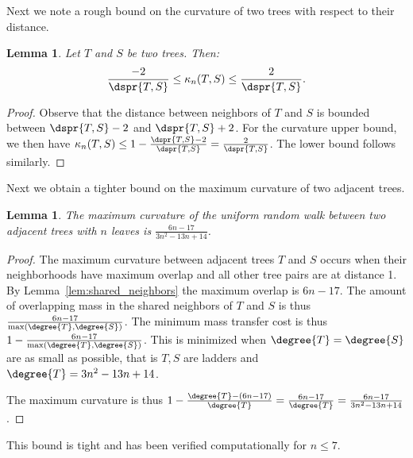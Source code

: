\documentclass[11pt,onecolumn,conference]{IEEEtran}
\newtheorem{lemma}[theorem]{Lemma}
\newcommand{\curvature}[2][]{%
    \ifthenelse{\equal{#1}{}}%
		{\kappa_n(#2)}%
		{\kappa_n(#1;#2)}%
}
\begin{document}
Next we note a rough bound on the curvature of two trees with respect to their distance.

\begin{lemma}
	\label{lem:curvature_distance_bound}
	Let $T$ and $S$ be two trees. Then:
	$$ \frac{-2}{\dspr{T,S}} \le \curvature{T,S} \le \frac{2}{\dspr{T,S}} .$$
\end{lemma}
\begin{proof}
	Observe that the distance between neighbors of $T$ and $S$ is bounded between $\dspr{T,S} - 2$ and $\dspr{T,S} + 2$.
	For the curvature upper bound, we then have $\curvature{T,S} \le 1 - \frac{\dspr{T,S} - 2}{\dspr{T,S}} = \frac{2}{\dspr{T,S}}$.
	The lower bound follows similarly.
\end{proof}

Next we obtain a tighter bound on the maximum curvature of two adjacent trees.
\begin{lemma}
	The maximum curvature of the uniform random walk between two adjacent trees with $n$ leaves is $\frac{6n-17}{3n^2-13n+14}$.
\end{lemma}
\begin{proof}
The maximum curvature between adjacent trees $T$ and $S$ occurs when their neighborhoods have maximum overlap and all other tree pairs are at distance 1.
By Lemma~\ref{lem:shared_neighbors} the maximum overlap is $6n-17$.
The amount of overlapping mass in the shared neighbors of $T$ and $S$ is thus $\frac{6n-17}{\max(\degree{T},\degree{S})}$.
The minimum mass transfer cost is thus $1 - \frac{6n-17}{\max(\degree{T},\degree{S})}$.
This is minimized when $\degree{T}=\degree{S}$ are as small as possible, that is $T,S$ are ladders and $\degree{T} = 3n^2 - 13n + 14$.

The maximum curvature is thus $1 - \frac{\degree{T} - (6n-17)}{\degree{T}} = \frac{6n - 17}{\degree{T}}= \frac{6n-17}{3n^2-13n+14}$.
\end{proof}
This bound is tight and has been verified computationally for $n \le 7$.
\end{document}
